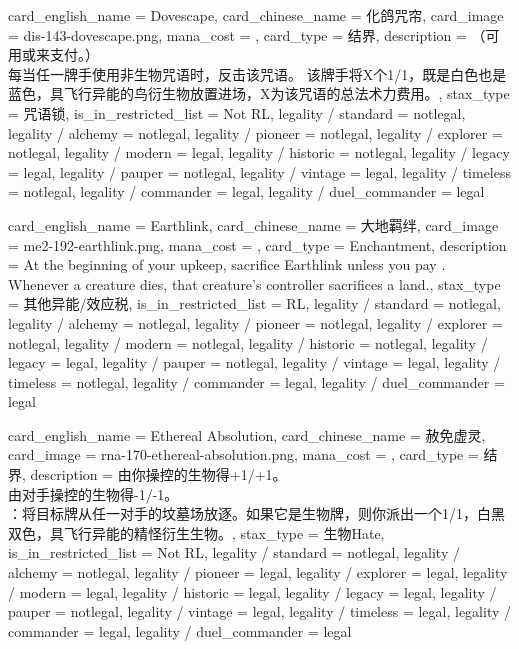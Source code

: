 \documentclass[lang = cn, color = black, 10pt]{AllThatStax}
\begin{document}
\card
{
	card_english_name = {Dovescape},
	card_chinese_name = {化鸽咒帘},
	card_image = dis-143-dovescape.png,
	mana_cost = ,
	card_type = 结界,
	description = {（可用或来支付。）\\
		每当任一牌手使用非生物咒语时，反击该咒语。 该牌手将X个1/1，既是白色也是蓝色，具飞行异能的鸟衍生物放置进场，X为该咒语的总法术力费用。},
	stax_type = 咒语锁,
	is_in_restricted_list = Not RL,
	legality / standard = notlegal,
	legality / alchemy = notlegal,
	legality / pioneer = notlegal,
	legality / explorer = notlegal,
	legality / modern = legal,
	legality / historic = notlegal,
	legality / legacy = legal,
	legality / pauper = notlegal,
	legality / vintage = legal,
	legality / timeless = notlegal,
	legality / commander = legal,
	legality / duel_commander = legal
}

\card
{
	card_english_name = {Earthlink},
	card_chinese_name = {大地羁绊},
	card_image = me2-192-earthlink.png,
	mana_cost = ,
	card_type = Enchantment,
	description = {At the beginning of your upkeep, sacrifice Earthlink unless you pay .\\
		Whenever a creature dies, that creature's controller sacrifices a land.},
	stax_type = 其他异能/效应税,
	is_in_restricted_list = RL,
	legality / standard = notlegal,
	legality / alchemy = notlegal,
	legality / pioneer = notlegal,
	legality / explorer = notlegal,
	legality / modern = notlegal,
	legality / historic = notlegal,
	legality / legacy = legal,
	legality / pauper = notlegal,
	legality / vintage = legal,
	legality / timeless = notlegal,
	legality / commander = legal,
	legality / duel_commander = legal
}

\card
{
	card_english_name = {Ethereal Absolution},
	card_chinese_name = {赦免虚灵},
	card_image = rna-170-ethereal-absolution.png,
	mana_cost = ,
	card_type = 结界,
	description = {由你操控的生物得+1/+1。\\
		由对手操控的生物得-1/-1。\\
		：将目标牌从任一对手的坟墓场放逐。如果它是生物牌，则你派出一个1/1，白黑双色，具飞行异能的精怪衍生生物。},
	stax_type = 生物Hate,
	is_in_restricted_list = Not RL,
	legality / standard = notlegal,
	legality / alchemy = notlegal,
	legality / pioneer = legal,
	legality / explorer = legal,
	legality / modern = legal,
	legality / historic = legal,
	legality / legacy = legal,
	legality / pauper = notlegal,
	legality / vintage = legal,
	legality / timeless = legal,
	legality / commander = legal,
	legality / duel_commander = legal
}
\end{document}
